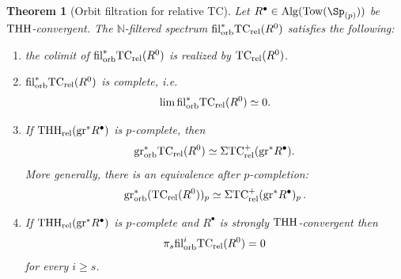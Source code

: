 \documentclass[english,10pt]{amsart}
\newcommand{\rel}{\textup{rel}}
\newtheorem{thm}{Theorem}[section]
\theoremstyle{definition}
\numberwithin{equation}{section}
\DeclareMathOperator{\thh}{\ensuremath{\textup{THH}}}
\newcommand{\rtc}{\mathrm{TC}_{\rel}}
\newcommand{\rthh}{\mathrm{THH}_{\rel}}
\newcommand{\rtcpl}{\mathrm{TC}_{\rel}^+}
\newcommand{\filorb}{\mathrm{fil}^{*}_{\textup{orb}}}
\newcommand{\filorbi}{\ensuremath{\mathrm{fil}}^i_{\textup{orb}}}
\newcommand{\grorbast}{\mathrm{gr}_{\textup{orb}}^*}
\newcommand{\Tow}{\mathrm{Tow}}
\newcommand{\Alg}{\mathrm{Alg}}
\newcommand{\N}{\mathbb{N}}
\newcommand{\gr}{\textup{gr}^*}
\begin{document}
\begin{thm}[Orbit filtration for relative TC]\label{theo orbit filtration}
Let $R^{\bullet}\in \Alg(\Tow(\Sp_{(p)}))$ be $\thh$-convergent. 
The $\N$-filtered spectrum $\filorb \rtc(R^0)$ satisfies the following:
\begin{enumerate}
\item \label{Orbit-filt-1} the colimit of  $\filorb \rtc(R^0)$ is realized by  $\rtc(R^0)$.
\item \label{Orbit-filt-2} $\filorb \rtc(R^0)$ is complete, i.e.\ 
\[\lim \filorb \rtc(R^0) \simeq 0.\]
\item  \label{Orbit-filt-3}
If $\rthh(\gr R^{\bullet})$ is $p$-complete, then 
\[\grorbast \rtc(R^0) \simeq \Sigma \rtcpl(\gr R^{\bullet}).\]
More generally, there is an equivalence after $p$-completion:
\[
\grorbast (\rtc(R^0))_p\simeq \Sigma \rtcpl(\gr R^{\bullet})_p\, .
\]

\item  \label{Orbit-filt-4} If $\rthh(\gr R^{\bullet})$ is $p$-complete and $R^{\bullet}$ is strongly $\thh$-convergent then 
\[\pi_s \filorbi \rtc(R^0) = 0\]
for every $i\geq s$.
\end{enumerate}
\end{thm}
\end{document}
